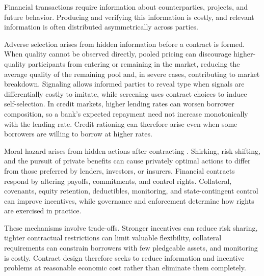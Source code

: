 
Financial transactions require information about counterparties, projects, and future behavior. Producing and verifying this information is costly, and relevant information is often distributed asymmetrically across parties.

Adverse selection arises from hidden information before a contract is formed. When quality cannot be observed directly, pooled pricing can discourage higher-quality participants from entering or remaining in the market, reducing the average quality of the remaining pool and, in severe cases, contributing to market breakdown. Signaling allows informed parties to reveal type when signals are differentially costly to imitate, while screening uses contract choices to induce self-selection. In credit markets, higher lending rates can worsen borrower composition, so a bank's expected repayment need not increase monotonically with the lending rate. Credit rationing can therefore arise even when some borrowers are willing to borrow at higher rates.

Moral hazard arises from hidden actions after contracting \cite{Holmstrom1979,JensenMeckling1976}. Shirking, risk shifting, and the pursuit of private benefits can cause privately optimal actions to differ from those preferred by lenders, investors, or insurers. Financial contracts respond by altering payoffs, commitments, and control rights. Collateral, covenants, equity retention, deductibles, monitoring, and state-contingent control can improve incentives, while governance and enforcement determine how rights are exercised in practice.

These mechanisms involve trade-offs. Stronger incentives can reduce risk sharing, tighter contractual restrictions can limit valuable flexibility, collateral requirements can constrain borrowers with few pledgeable assets, and monitoring is costly. Contract design therefore seeks to reduce information and incentive problems at reasonable economic cost rather than eliminate them completely.


